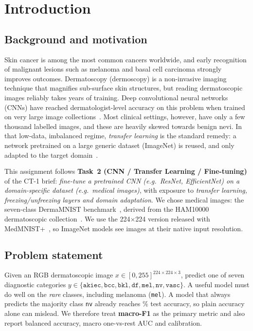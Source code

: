 \section{Introduction}
\label{sec:intro}

\subsection{Background and motivation}
Skin cancer is among the most common cancers worldwide, and early recognition of malignant lesions such as
melanoma and basal cell carcinoma strongly improves outcomes. Dermatoscopy (dermoscopy) is a non-invasive
imaging technique that magnifies sub-surface skin structures, but reading dermatoscopic images reliably takes
years of training. Deep convolutional neural networks (CNNs) have reached dermatologist-level accuracy on this
problem when trained on very large image collections~\cite{esteva2017}. Most clinical settings, however, have only
a few thousand labelled images, and these are heavily skewed towards benign nevi. In that low-data, imbalanced
regime, \emph{transfer learning} is the standard remedy: a network pretrained on a large generic dataset
(ImageNet) is reused, and only adapted to the target domain~\cite{yosinski2014,kornblith2019}.

This assignment follows \textbf{Task~2 (CNN / Transfer Learning / Fine-tuning)} of the CT-1 brief:
\emph{fine-tune a pretrained CNN (e.g.\ ResNet, EfficientNet) on a domain-specific dataset (e.g.\ medical
images)}, with exposure to \emph{transfer learning, freezing/unfreezing layers and domain adaptation}. We chose
medical images: the seven-class DermaMNIST benchmark~\cite{medmnistv2}, derived from the HAM10000 dermatoscopic
collection~\cite{ham10000}. We use the 224$\times$224 version released with MedMNIST+~\cite{medmnistplus}, so
ImageNet models see images at their native input resolution.

\subsection{Problem statement}
Given an RGB dermatoscopic image $x \in [0,255]^{224\times224\times3}$, predict one of seven diagnostic
categories $y \in \{\texttt{akiec},\texttt{bcc},\texttt{bkl},\texttt{df},\texttt{mel},\texttt{nv},\texttt{vasc}\}$.
A useful model must do well on the \emph{rare} classes, including melanoma (\texttt{mel}). A model that always
predicts the majority class \texttt{nv} already reaches \MajorityAcc\% test accuracy, so plain accuracy alone
can mislead. We therefore treat \textbf{macro-F1} as the primary metric and also report balanced accuracy,
macro one-vs-rest AUC and calibration.

